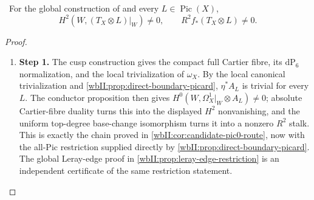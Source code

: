 \begin{corollary}
\hypertarget{tag-03DR}{}\label{wbII:cor:candidate-conductor-actual}

\ For the global construction of
 and every
$L\in\operatorname{Pic}(X)$,
\[
H^2(W,(T_X\otimes L)|_W)\ne0,
\qquad R^2f_*(T_X\otimes L)\ne0.
\]
\end{corollary}



\begin{proof}
\begin{enumerate}[label={$\langle1\rangle$\arabic*.},leftmargin=*]
\item 
\noindent\textbf{Step 1.} The cusp construction gives the compact full Cartier fibre, its
$\mathrm{dP}_6$ normalization, and the local trivialization of $\omega_X$.
By the local canonical trivialization and
\cref{wbII:prop:direct-boundary-picard}, $\eta^*A_L$ is trivial for every $L$.
The conductor proposition then gives
$H^0(W,\Omega_X^1|_W\otimes A_L)\ne0$; absolute Cartier-fibre duality turns
this into the displayed $H^2$ nonvanishing, and the uniform top-degree
base-change isomorphism turns it into a nonzero $R^2$ stalk.  This is exactly
the chain proved in \cref{wbII:cor:candidate-pic0-route}, now with the all-Pic
restriction supplied directly by \cref{wbII:prop:direct-boundary-picard}.  The
global Leray-edge proof in \cref{wbII:prop:leray-edge-restriction} is an
independent certificate of the same restriction statement.

\end{enumerate}
\end{proof}

